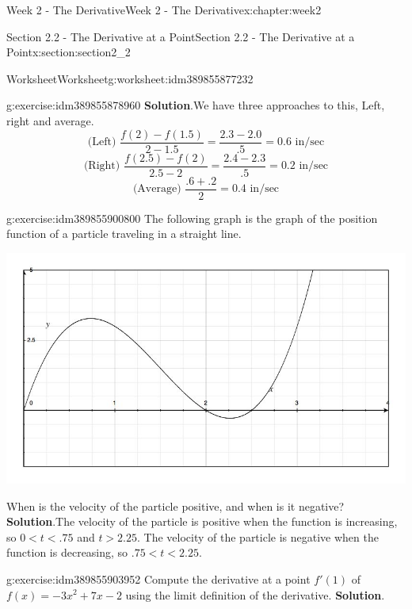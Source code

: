 \documentclass[oneside,10pt,]{book}
\newcommand{\blocktitlefont}{\relax}
\numberwithin{equation}{section}
\begin{document}
\begin{chapterptx}{Week 2 - The Derivative}{}{Week 2 - The Derivative}{}{}{x:chapter:week2}
\begin{sectionptx}{Section 2.2 - The Derivative at a Point}{}{Section 2.2 - The Derivative at a Point}{}{}{x:section:section2_2}
\begin{worksheet-subsection}{Worksheet}{}{Worksheet}{}{}{g:worksheet:idm389855877232}
\begin{divisionexercise}{1}{}{}{g:exercise:idm389855878960}
\textbf{\blocktitlefont Solution}.\hypertarget{g:solution:idm389855879440}{}\quad{}We have three approaches to this, Left, right and average.%
\begin{equation*}
\text{(Left) } \frac{f(2)-f(1.5)}{2-1.5} = \frac{2.3-2.0}{.5} = 0.6 \text{ in/sec}
\end{equation*}
%
\begin{equation*}
\text{(Right) } \frac{f(2.5)-f(2)}{2.5-2} = \frac{2.4-2.3}{.5} = 0.2 \text{ in/sec}
\end{equation*}
%
\begin{equation*}
\text{(Average) } \frac{.6+.2}{2} = 0.4 \text{ in/sec}
\end{equation*}
%
\end{divisionexercise}%
\begin{divisionexercise}{2}{}{}{g:exercise:idm389855900800}%
The following graph is the graph of the position function of a particle traveling in a straight line. \begin{image}{0}{1}{0}%
\includegraphics[width=\linewidth]{images/Math140S13wksht5g1.jpg}
\end{image}%
 When is the velocity of the particle positive, and when is it negative?%
\textbf{\blocktitlefont Solution}.\hypertarget{g:solution:idm389855904832}{}\quad{}The velocity of the particle is positive when the function is increasing, so \(0 < t < .75 \) and \(t > 2.25\). The velocity of the particle is negative when the function is decreasing, so \(.75 < t < 2.25\).%
\end{divisionexercise}%
\begin{divisionexercise}{3}{}{}{g:exercise:idm389855903952}%
Compute the derivative at a point \(f'(1)\) of \(f(x)=-3x^2+7x-2\) using the limit definition of the derivative.%
\textbf{\blocktitlefont Solution}.\hypertarget{g:solution:idm389855925648}{}\quad{}%

\end{divisionexercise}
\end{worksheet-subsection}
\end{sectionptx}
\end{chapterptx}
\end{document}
